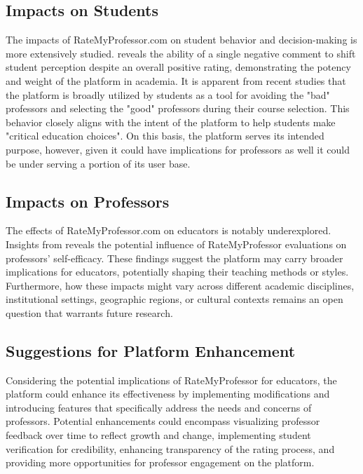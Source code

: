 \documentclass[twocolumn, doc,12pt]{apa7}
\begin{document}
\subsection*{Impacts on Students}
The impacts of RateMyProfessor.com on student behavior and decision-making is more extensively studied. \textcite{scherr_single_2013} reveals the ability of a single negative comment to shift student perception despite an overall positive rating, demonstrating the potency and weight of the platform in academia. It is apparent from recent studies that the platform is broadly utilized by students as a tool for avoiding the "bad" professors and selecting the "good" professors during their course selection. This behavior closely aligns with the intent of the platform to help students make "critical education choices". On this basis, the platform serves its intended purpose, however, given it could have implications for professors as well it could be under serving a portion of its user base.

\subsection*{Impacts on Professors}
The effects of RateMyProfessor.com on educators is notably underexplored.  Insights from \textcite{boswell_ratemyprofessors_2016} reveals the potential influence of RateMyProfessor evaluations on professors' self-efficacy. These findings suggest the platform may carry broader implications for educators, potentially shaping their teaching methods or styles. Furthermore, how these impacts might vary across different academic disciplines, institutional settings, geographic regions, or cultural contexts remains an open question that warrants future research.

\subsection*{Suggestions for Platform Enhancement}
Considering the potential implications of RateMyProfessor for educators, the platform could enhance its effectiveness by implementing modifications and introducing features that specifically address the needs and concerns of professors. Potential enhancements could encompass visualizing professor feedback over time to reflect growth and change, implementing student verification for credibility, enhancing transparency of the rating process, and providing more opportunities for professor engagement on the platform. 
\end{document}
